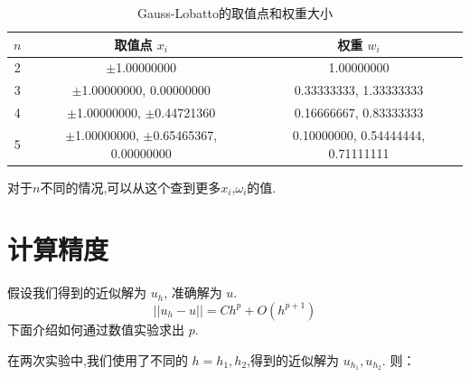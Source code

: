 \documentclass{book}
\begin{document}
\begin{example}
\begin{example}{}{}
\begin{example}
\begin{example}
\begin{example}
\begin{example}
\begin{example}{}{}
\begin{example}
\begin{table}[ht]
    \centering
    \caption{Gauss-Lobatto的取值点和权重大小}
    \label{tab:Gauss-Lobatto积分}
    \begin{tabular}{ccc}
        \toprule
        $n$ & 取值点 $x_i$                                 & 权重 $w_i$                         \\
        \midrule
        2   & $\pm$1.00000000                              & 1.00000000                         \\
        3   & $\pm$1.00000000, 0.00000000                  & 0.33333333, 1.33333333             \\
        4   & $\pm$1.00000000, $\pm$0.44721360             & 0.16666667, 0.83333333             \\
        5   & $\pm$1.00000000, $\pm$0.65465367, 0.00000000 & 0.10000000, 0.54444444, 0.71111111 \\
        \bottomrule
    \end{tabular}
\end{table}
对于$n$不同的情况,可以从这个\cite{RN106}查到更多$x_i$,$\omega_i$的值.
\section{计算精度}
假设我们得到的近似解为 $u_h$, 准确解为 $u$.
\begin{equation}
    || u_h-u || = Ch^p + O(h^{p+1})
\end{equation}
下面介绍如何通过数值实验求出 $p$.

在两次实验中,我们使用了不同的 $h=h_1,h_2$,得到的近似解为 $u_{h_1},u_{h_2}$. 则：


\end{example}
\end{example}
\end{example}
\end{example}
\end{example}
\end{example}
\end{example}
\end{example}
\end{document}
